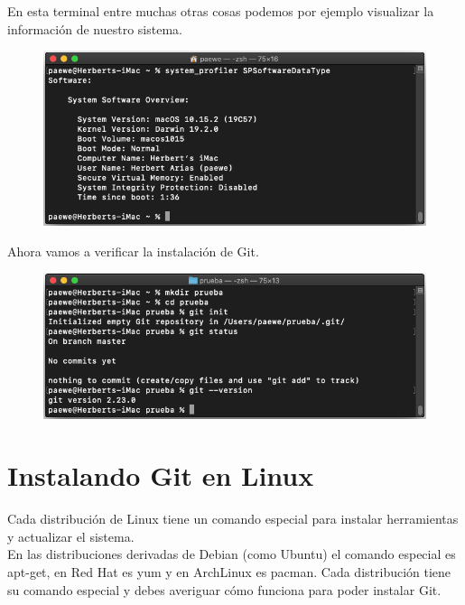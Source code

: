 \documentclass{article}
\begin{document}
En esta terminal entre muchas otras cosas podemos por ejemplo visualizar la
información de nuestro sistema.

\begin{figure}[h!]
  \centering
  \includegraphics[scale=0.5]{./Pictures/036_mac_terminal.png}
\end{figure}

\newpage

Ahora vamos a verificar la instalación de Git.

\begin{figure}[h!]
  \centering
  \includegraphics[scale=0.5]{./Pictures/035_mac_git.png}
\end{figure}

\newpage

\section{Instalando Git en Linux}%
Cada distribución de Linux tiene un comando especial para instalar herramientas
y actualizar el sistema.\\

En las distribuciones derivadas de Debian (como Ubuntu) el comando especial es
apt-get, en Red Hat es yum y en ArchLinux es pacman. Cada distribución tiene su
comando especial y debes averiguar cómo funciona para poder instalar Git.\\
\end{document}
